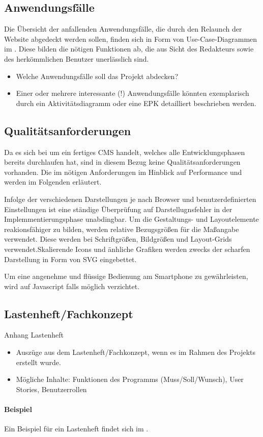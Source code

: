 \subsection{Anwendungsfälle}
\label{sec:Anwendungsfaelle}

Die Übersicht der anfallenden Anwendungsfälle, die durch den Relaunch der
Website abgedeckt werden sollen, finden sich in Form von Use-Case-Diagrammen im
. Diese bilden die nötigen Funktionen ab, die aus Sicht
des Redakteurs sowie des herkömmlichen Benutzer unerlässlich sind.

\begin{itemize}
	\item Welche Anwendungsfälle soll das Projekt abdecken?
	\item Einer oder mehrere interessante (!) Anwendungsfälle könnten exemplarisch durch ein Aktivitätsdiagramm oder eine \ac{EPK} detailliert beschrieben werden. 
\end{itemize}


\subsection{Qualitätsanforderungen}
\label{sec:Qualitaetsanforderungen}

Da es sich bei \ct um ein fertiges \ac{CMS} handelt, welches alle
Entwicklungsphasen bereits durchlaufen hat, sind in diesem Bezug keine
Qualitätsanforderungen vorhanden. Die im  nötigen
Anforderungen im Hinblick auf Performance und  werden im
Folgenden erläutert.

Infolge der verschiedenen Darstellungen je nach Browser und
benutzerdefinierten Einstellungen ist eine ständige Überprüfung auf
Darstellugnsfehler in der Implemmentierungsphase unabdingbar.
Um die Gestaltungs- und Layoutelemente reakionsfähiger zu bilden, werden
relative Bezugsgrößen für die Maßangabe verwendet. Diese werden \zB bei
Schriftgrößen, Bildgrößen und Layout-Grids verwendet.Skalierende Icons und 
änhliche Grafiken werden zwecks der scharfen Darstellung in Form von \ac{SVG}
eingebettet.

Um eine angenehme und flüssige Bedienung am Smartphone zu gewährleisten, wird
auf Javascript falls möglich verzichtet.

\subsection{Lastenheft/Fachkonzept}
\label{sec:Lastenheft}
\xx Anhang Lastenheft
\begin{itemize}
	\item Auszüge aus dem Lastenheft/Fachkonzept, wenn es im Rahmen des Projekts erstellt wurde.
	\item Mögliche Inhalte: Funktionen des Programms (Muss/Soll/Wunsch), User Stories, Benutzerrollen
\end{itemize}

\paragraph{Beispiel}
Ein Beispiel für ein Lastenheft findet sich im . 

